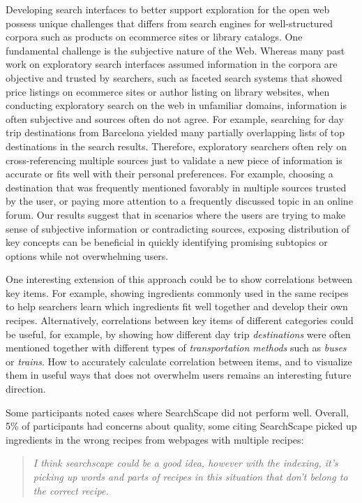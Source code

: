 Developing search interfaces to better support exploration for the open web possess unique challenges that differs from search engines for well-structured corpora such as products on ecommerce sites or library catalogs. One fundamental challenge is the subjective nature of the Web.
Whereas many past work on exploratory search interfaces assumed information in the corpora are objective and trusted by searchers, such as faceted search systems that showed price listings on ecommerce sites or author listing on library websites, when conducting exploratory search on the web in unfamiliar domains, information is often subjective and sources often do not agree. For example, searching for day trip destinations from Barcelona yielded many partially overlapping lists of top destinations in the search results. Therefore, exploratory searchers often rely on cross-referencing multiple sources just to validate a new piece of information is accurate or fits well with their personal preferences. For example, choosing a destination that was frequently mentioned favorably in multiple sources trusted by the user, or paying more attention to a frequently discussed topic in an online forum. Our results suggest that in scenarios where the users are trying to make sense of subjective information or contradicting sources, exposing distribution of key concepts can be beneficial in quickly identifying promising subtopics or options while not overwhelming users. 

One interesting extension of this approach could be to show correlations between key items. For example, showing ingredients commonly used in the same recipes to help searchers learn which ingredients fit well together and develop their own recipes. Alternatively, correlations between key items of different categories could be useful, for example, by showing how different day trip \emph{destinations} were often mentioned together with different types of \emph{transportation methods} such as \emph{buses} or \emph{trains}. How to accurately calculate correlation between items, and to visualize them in useful ways that does not overwhelm users remains an interesting future direction.

Some participants noted cases where SearchScape did not perform well. Overall, 5\% of participants had concerns about quality, some citing SearchScape picked up ingredients in the wrong recipes from webpages with multiple recipes:

\blockquote{\emph{I think searchscape could be a good idea, however with the indexing, it's picking up words and parts of recipes in this situation that don't belong to the correct recipe.}}



